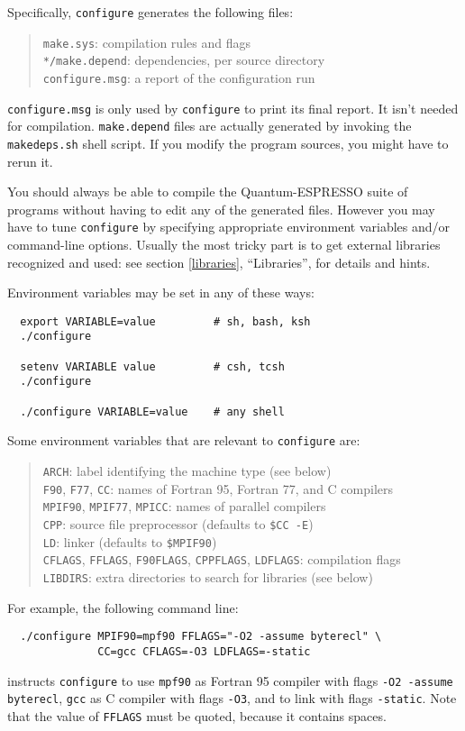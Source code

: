 \documentclass[12pt,a4paper]{article}
\begin{document}
Specifically, \texttt{configure} generates the following files:
\begin{quote}
  \texttt{make.sys}: compilation rules and flags\\
  \texttt{*/make.depend}: dependencies, per source directory\\
  \texttt{configure.msg}: a report of the configuration run
\end{quote}

\texttt{configure.msg} is only used by \texttt{configure} to print its
final report.  It isn't needed for compilation.
\texttt{make.depend} files are actually generated by invoking the
\texttt{makedeps.sh} shell script.  If you modify the program sources,
you might have to rerun it.

You should always be able to compile the Quantum-ESPRESSO suite of programs
without having to edit any of the generated files.  However you may
have to tune \texttt{configure} by specifying appropriate environment
variables and/or command-line options.
Usually the most tricky part is to get external libraries recognized
and used: see section \ref{libraries}, ``Libraries'', for details and
hints.

Environment variables may be set in any of these ways:
\begin{verbatim}
  export VARIABLE=value         # sh, bash, ksh
  ./configure

  setenv VARIABLE value         # csh, tcsh
  ./configure

  ./configure VARIABLE=value    # any shell
\end{verbatim}
Some environment variables that are relevant to \texttt{configure} are:
\begin{quote}
  \texttt{ARCH}:
    label identifying the machine type (see below)\\
  \texttt{F90}, \texttt{F77}, \texttt{CC}:
    names of Fortran 95, Fortran 77, and C compilers\\
  \texttt{MPIF90}, \texttt{MPIF77}, \texttt{MPICC}:
    names of parallel compilers\\
  \texttt{CPP}:
    source file preprocessor (defaults to \texttt{\$CC -E})\\
  \texttt{LD}: linker (defaults to \texttt{\$MPIF90})\\
  \texttt{CFLAGS}, \texttt{FFLAGS}, \texttt{F90FLAGS},
    \texttt{CPPFLAGS}, \texttt{LDFLAGS}:
    compilation flags\\
  \texttt{LIBDIRS}:
    extra directories to search for libraries (see below)
\end{quote}
For example, the following command line:
\begin{verbatim}
  ./configure MPIF90=mpf90 FFLAGS="-O2 -assume byterecl" \
              CC=gcc CFLAGS=-O3 LDFLAGS=-static
\end{verbatim}
instructs \texttt{configure} to use \texttt{mpf90} as Fortran 95
compiler with flags \texttt{-O2 -assume byterecl},
\texttt{gcc} as C compiler with flags \texttt{-O3}, and to link with
flags \texttt{-static}.  Note that the value of \texttt{FFLAGS} must
be quoted, because it contains spaces.
\end{document}
